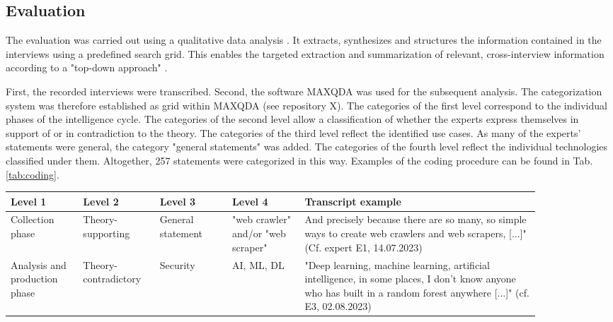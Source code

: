 \documentclass[10pt]{article}
\begin{document}
\subsection{Evaluation}

The evaluation was carried out using a qualitative data analysis \cite{Glaser.2009}.
It extracts, synthesizes and structures the information contained in the interviews
using a predefined search grid. This enables the targeted
extraction and summarization of relevant, cross-interview information
according to a "top-down approach" \cite{Bogner.2014, Glaser.2009}.

First, the recorded interviews were transcribed. Second, the software
MAXQDA \cite{MAXQDA.19.07.2023} was used for the subsequent analysis.
The categorization system was therefore established as grid within MAXQDA
(see repository X). The categories of the first level correspond to
the individual phases of the intelligence cycle. The categories of the
second level allow a classification of whether the experts express
themselves in support of or in contradiction to the theory. The
categories of the third level reflect the identified use cases.
As many of the experts' statements were general, the
category "general statements" was added. The categories
of the fourth level reflect the individual technologies classified
under them. Altogether, 257 statements were categorized in this way. Examples of the coding
procedure can be found in Tab. \ref{tab:coding}.

\begin{table*}[htbp]
    \caption{Coding examples}
    \label{tab:coding}
    \begin{tabular*}{\textwidth}{|p{0.12\linewidth}|p{0.12\linewidth}|p{0.12\linewidth}|p{0.12\linewidth}|p{0.39\linewidth}|}
        \hline
        \textbf{Level 1} & \textbf{Level 2} & \textbf{Level 3} & \textbf{Level 4} & \textbf{Transcript example} \\
        \hline
        Collection phase & Theory- supporting & General statement & "web crawler" and/or "web scraper" & And precisely because there are so many, so simple ways to create web crawlers and web scrapers, [...]"(Cf. expert E1, 14.07.2023) \\
        \hline
        Analysis and production phase & Theory- contradictory & Security & AI, ML, DL & "Deep learning, machine learning, artificial intelligence, in some places, I don't know anyone who has built in a random forest anywhere [...]" (cf. E3, 02.08.2023) \\
        \hline
    \end{tabular*}
\end{table*}
\end{document}
